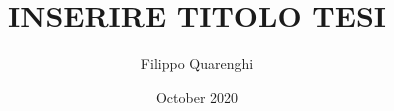 \documentclass[a4paper,12pt]{book}
\begin{document}
\author{Filippo Quarenghi}
\title{INSERIRE TITOLO TESI}
\date{October 2020}

\frontmatter
\maketitle
\tableofcontents

\mainmatter






\backmatter
\end{document}
